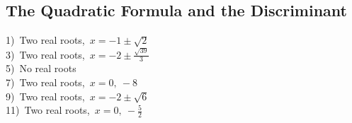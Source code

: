 \documentclass[11pt]{book}
\newcommand{\tmstrong}[1]{\textbf{#1}}
\theoremstyle{definition}  %
\begin{document}

\subsection*{The Quadratic Formula and the Discriminant}

\begin{multicols}{2}
  1)~Two real roots,~$x=-1\pm\sqrt{2}$\\
  3)~Two real roots,~$x=-2\pm\frac{\sqrt{39}}{3}$\\
  5)~No real roots\\
  7)~Two real roots,~$x=0,~-8$\\
  9)~Two real roots,~$x=-2\pm\sqrt{6}$\\
  11)~Two real roots,~$x=0,~-\frac{5}{2}$\\
\end{multicols}

\end{document}
